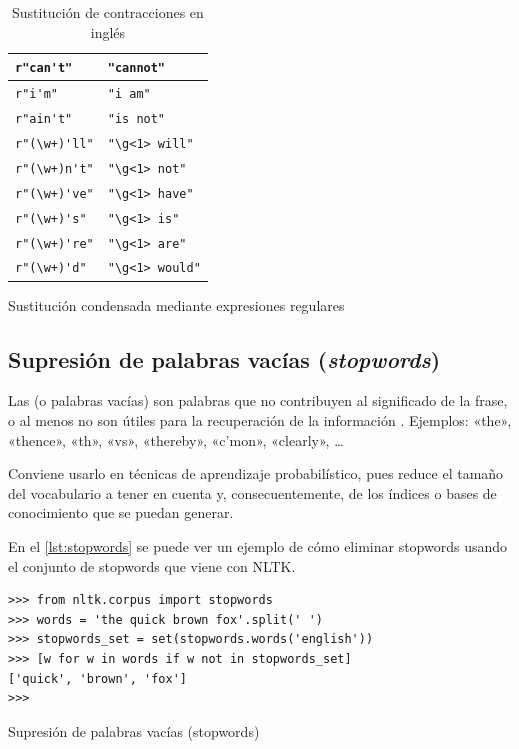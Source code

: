 \begin{table}[htbp]
\begin{subtable}[t]{0.45\linewidth}
\begin{tabular}{|l|l|}
\verb=r"can't"= & \verb="cannot"= \\ \hline
\verb=r"i'm"= & \verb="i am"= \\ \hline
\verb=r"ain't"= & \verb="is not"= \\ \hline
\verb=r"(\w+)'ll"= & \verb="\g<1> will"= \\ \hline
\verb=r"(\w+)n't"= & \verb="\g<1> not"= \\ \hline
\verb=r"(\w+)'ve"= & \verb="\g<1> have"= \\ \hline
\verb=r"(\w+)'s"= & \verb="\g<1> is"= \\ \hline
\verb=r"(\w+)'re"= & \verb="\g<1> are"= \\ \hline
\verb=r"(\w+)'d"= & \verb="\g<1> would"= \\ \hline
\end{tabular}
\caption{Sustitución condensada mediante expresiones regulares}
\label{tbl:contracciones-regexp}
\end{subtable}
\vfill
\caption{Sustitución de contracciones en inglés}
\label{tbl:contracciones}
\end{table}

\subsection{Supresión de palabras vacías (\emph{stopwords})}

Las  (o palabras vacías) son palabras que no contribuyen al significado de la frase, o al menos no son útiles para la recuperación de la información \citep{Perkins2010}. Ejemplos: «the», «thence», «th», «vs», «thereby», «c'mon», «clearly», \ldots

Conviene usarlo en técnicas de aprendizaje probabilístico, pues reduce el tamaño del vocabulario a tener en cuenta y, consecuentemente, de los índices o bases de conocimiento que se puedan generar.

En el \autoref{lst:stopwords} se puede ver un ejemplo de cómo eliminar stopwords usando el conjunto de stopwords que viene con NLTK.

\begin{listing}[htbp]
\begin{verbatim}
>>> from nltk.corpus import stopwords
>>> words = 'the quick brown fox'.split(' ')
>>> stopwords_set = set(stopwords.words('english'))
>>> [w for w in words if w not in stopwords_set]
['quick', 'brown', 'fox']
>>> 
\end{verbatim}
\caption{Supresión de palabras vacías (stopwords)}
\label{lst:stopwords}
\end{listing}

